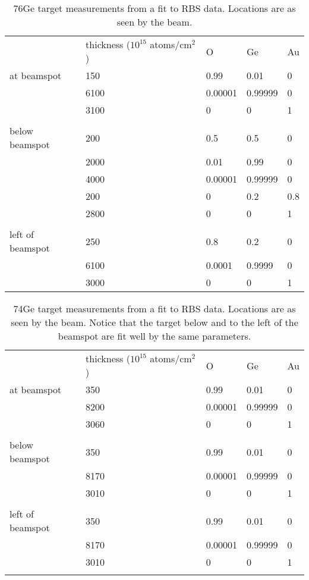 \documentclass[12pt]{article}
\begin{document}
\begin{table}[h]
\centering
\begin{tabular}{lllll}
            & thickness ($10^{15}$ atoms/cm$^2$) & O & Ge & Au \\
at beamspot & 150 & 0.99 & 0.01 & 0 \\
	    & 6100 & 0.00001 & 0.99999 & 0 \\
	    & 3100 & 0 & 0 & 1 \\ \\

below beamspot & 200 & 0.5 & 0.5 & 0 \\
	       & 2000 & 0.01 & 0.99 & 0 \\
	       & 4000 & 0.00001 & 0.99999 & 0 \\
	       & 200 & 0 & 0.2 & 0.8 \\
	       & 2800 & 0 & 0 & 1 \\ \\

left of beamspot & 250 & 0.8 & 0.2 & 0 \\
		 & 6100 & 0.0001 & 0.9999 & 0 \\
		 & 3000 & 0 & 0 & 1 \\
\end{tabular}
\caption{76Ge target measurements from a fit to RBS data.  Locations are as seen by the beam.}
\end{table}

\begin{table}[h]
\centering
\begin{tabular}{lllll}
            & thickness ($10^{15}$ atoms/cm$^2$) & O & Ge & Au \\
at beamspot & 350 & 0.99 & 0.01 & 0 \\ 
	    & 8200 & 0.00001 & 0.99999 & 0 \\
	    & 3060 & 0 & 0 & 1 \\ \\

below beamspot & 350 & 0.99 & 0.01 & 0 \\
	       & 8170 & 0.00001 & 0.99999 & 0 \\
	       & 3010 & 0 & 0 & 1 \\ \\

left of beamspot & 350 & 0.99 & 0.01 & 0 \\
	         & 8170 & 0.00001 & 0.99999 & 0 \\
	         & 3010 & 0 & 0 & 1 \\ \\
\end{tabular}
\caption{74Ge target measurements from a fit to RBS data.  Locations are as seen by the beam.  Notice that the target below and to the left of the beamspot are fit well by the same parameters.}
\end{table}
\end{document}
